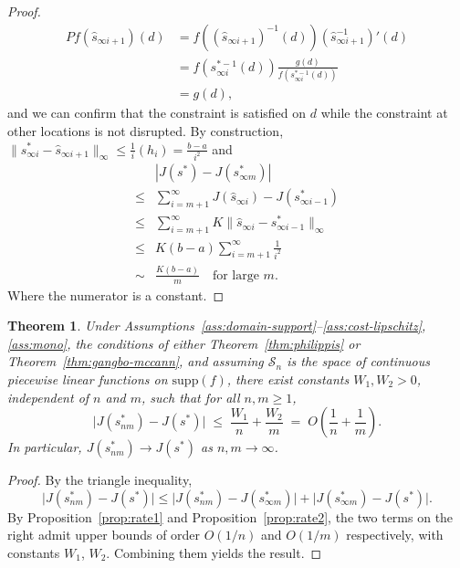 \documentclass[12pt,leqno]{amsart}
\newtheorem{theorem}{Theorem}
\begin{document}
\begin{proof}
\begin{align*}
    Pf(\hat{s}_{\infty i+1})(d)&=f((\hat{s}_{\infty i+1})^{-1}(d))(\hat{s}_{\infty i+1}^{-1})'(d)\\
    &=f(s_{\infty i}^{*-1}(d))\frac{g(d)}{f(s_{\infty i}^{*-1}(d))}\\
    &=g(d),
\end{align*}
and we can confirm that the constraint is satisfied on $d$ while the constraint at other locations is not disrupted. By construction, $\|s_{\infty i}^{*}-\hat{s}_{\infty i+1}\|_{\infty}\leq \frac{1}{i}(h_i)=\frac{b-a}{i^2}$ and 
\begin{align*}
    &|J(s^*)-J(s_{\infty m}^*)|\\
    \leq&\sum_{i=m+1}^{\infty} J(\hat{s}_{\infty i})-J(s_{\infty i-1}^*)\\
    \leq&\sum_{i=m+1}^{\infty}K \|\hat{s}_{\infty i}-s_{\infty i-1}^{*}\|_{\infty}\\
    \leq&K(b-a)\sum_{i=m+1}^{\infty}\frac{1}{i^2}\\
    \sim&\frac{K(b-a)}{m}\quad\text{for large } m.
\end{align*}
Where the numerator is a constant.
\end{proof}

\begin{theorem}\label{thm:rate-main}
Under Assumptions~\ref{ass:domain-support}--\ref{ass:cost-lipschitz}, \ref{ass:mono}, the conditions of either Theorem~\ref{thm:philippis} or Theorem~\ref{thm:gangbo-mccann}, and assuming $\mathcal{S}_n$ is the space of continuous piecewise linear functions on $\mathrm{supp}(f)$, there exist constants $W_1,W_2>0$, independent of $n$ and $m$, such that for all $n,m\ge 1$,
\[
\bigl|J(s_{nm}^*)-J(s^*)\bigr|
\;\le\;
\frac{W_1}{n}+\frac{W_2}{m}
\;=\;
O\!\left(\frac1n+\frac1m\right).
\]
In particular, $J(s_{nm}^*)\to J(s^*)$ as $n,m\to\infty$.
\end{theorem}

\begin{proof}
By the triangle inequality,
\[
\bigl|J(s_{nm}^*)-J(s^*)\bigr|
\le
\bigl|J(s_{nm}^*)-J(s_{\infty m}^*)\bigr|
+
\bigl|J(s_{\infty m}^*)-J(s^*)\bigr|.
\]
By Proposition~\ref{prop:rate1} and Proposition~\ref{prop:rate2}, the two terms on the right admit upper bounds of order $O(1/n)$ and $O(1/m)$ respectively, with constants $W_1$, $W_2$. Combining them yields the result.
\end{proof}
\end{document}
